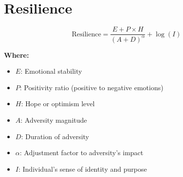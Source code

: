 \chapter{Resilience}

\begin{equation}
\text{Resilience} = \frac{E + P \times H}{(A + D)^\alpha} + \log(I)
\end{equation}

\textbf{Where:}

\begin{itemize}
    \item $E$: Emotional stability
    \item $P$: Positivity ratio (positive to negative emotions)
    \item $H$: Hope or optimism level
    \item $A$: Adversity magnitude
    \item $D$: Duration of adversity
    \item $\alpha$: Adjustment factor to adversity's impact
    \item $I$: Individual's sense of identity and purpose
\end{itemize}